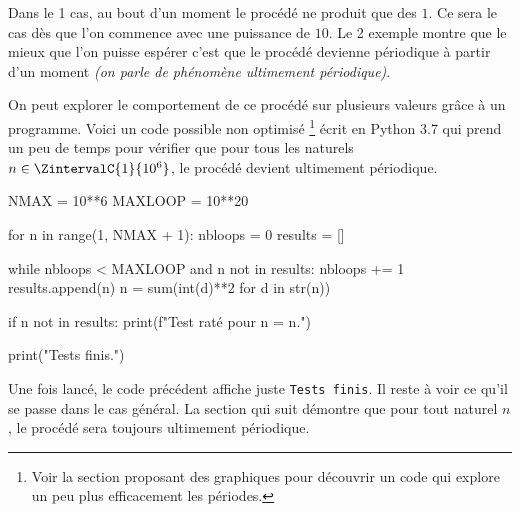 Dans le 1\ier{} cas, au bout d'un moment le procédé ne produit que des $1$. Ce sera le cas dès que l'on commence avec une puissance de $10$. Le 2\ieme{} exemple montre que le mieux que l'on puisse espérer c'est que le procédé devienne périodique à partir d'un moment \emph{(on parle de phénomène ultimement périodique)}.


\medskip

On peut explorer le comportement de ce procédé sur plusieurs valeurs grâce à un programme. Voici un code possible non optimisé
\footnote{
	Voir la section proposant des graphiques pour découvrir un code qui explore un peu plus efficacement les périodes.
}
écrit en Python 3.7 qui prend un peu de temps pour vérifier que pour tous les naturels $n \in \ZintervalC{1}{10^6}$, le procédé devient ultimement périodique.

\begin{rawcode}
NMAX    = 10**6
MAXLOOP = 10**20

for n in range(1, NMAX + 1):
    nbloops = 0
    results = []

    while nbloops < MAXLOOP and n not in results:
        nbloops += 1
        results.append(n)
        n = sum(int(d)**2 for d in str(n))

    if n not in results:
        print(f"Test raté pour n = {n}.")

print("Tests finis.")
\end{rawcode}

\medskip

Une fois lancé, le code précédent affiche juste \verb+Tests finis+.
Il reste à voir ce qu'il se passe dans le cas général. La section qui suit démontre que pour tout naturel $n$, le procédé sera toujours ultimement périodique.

